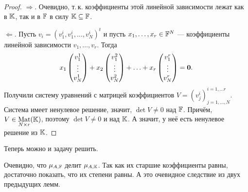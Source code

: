 \begin{proof}
    $\Rightarrow$. Очевидно, т.\,к. коэффициенты этой линейной зависимости лежат как в $\mathbb{K}$, так и в $\mathbb{F}$ в силу $\mathbb{K} \subseteq \mathbb{F}$.

    $\Leftarrow$. Пусть $v_i = (v^i_1, v^i_1, \ldots, v^i_N)^t$ и пусть $x_1, \ldots, x_r \in \mathbb{F}^N$ --- коэффициенты линейной зависимости $v_1, \ldots, v_r$. Тогда
    \[
        x_1
        \begin{pmatrix}
            v^1_1\\
            \vdots\\
            v^1_N
        \end{pmatrix} +
        x_2
        \begin{pmatrix}
            v^2_1\\
            \vdots\\
            v^2_N
        \end{pmatrix} + \ldots +
        x_r
        \begin{pmatrix}
            v^r_1\\
            \vdots\\
            v^r_N
        \end{pmatrix} = \boldsymbol{0}.
    \]
    Получили систему уравнений с матрицей коэффициентов $V = (v^i_j)^{i = 1, \ldots r}_{j = 1, \ldots, N}$. Система имеет ненулевое решение, значит, $\det V \ne 0$ над $\mathbb{F}$. Причём, $V \in \underset{N \times r}{\operatorname{Mat}}(\mathbb{K})$, поэтому $\det V \ne 0$ и над $\mathbb{K}$. А значит, у неё есть ненулевое решение из $\mathbb{K}$.
\end{proof}

Теперь можно и задачу решить.

\begin{solution}
    Очевидно, что $\mu_{A, \mathbb{F}}$ делит $\mu_{A, \mathbb{K}}$. Так как их старшие коэффициенты равны, достаточно показать, что их степени равны. А это очевидное следствие из двух предыдущих лемм.
\end{solution}

